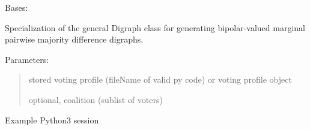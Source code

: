 \documentclass[letterpaper,10pt,english]{sphinxmanual}
\begin{document}
\begin{fulllineitems}
\label{techDoc:votingDigraphs.CondorcetDigraph}
Bases: {\hyperref[techDoc:digraphs.Digraph]{}}

Specialization of the general Digraph class for generating
bipolar-valued marginal pairwise majority difference digraphs.

Parameters:
\begin{quote}

\begin{DUlineblock}{0em}
\item[] stored voting profile (fileName of valid py code) or voting profile object
\item[] optional, coalition (sublist of voters)
\end{DUlineblock}
\end{quote}

Example Python3 session


\end{fulllineitems}
\end{document}

